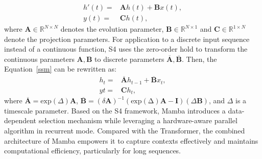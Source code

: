 \documentclass{article}
\begin{document}
\begin{equation}
\begin{aligned}
    h'(t) =& \mathbf{A}h(t) + \mathbf{B}x(t),\\
    y(t) =& \mathbf{C}h(t),
\label{ssm}
\end{aligned}
\end{equation}
where $\mathbf{A}\in\mathbb{R}^{N\times N}$ denotes the evolution parameter, $\mathbf{B}\in\mathbb{R}^{N\times 1}$ and $\mathbf{C}\in\mathbb{R}^{1\times N}$ denote the projection parameters. For application to a discrete input sequence instead of a continuous function, S4 uses the zero-order hold to transform the continuous parameters $\mathbf{A},\mathbf{B}$ to discrete parameters $\overline{\mathbf{A}},\overline{\mathbf{B}}$. Then, the Equation~\eqref{ssm} can be rewritten as:
\begin{equation}
\begin{aligned}
    h_t =& \overline{\mathbf{A}}h_{t-1} + \overline{\mathbf{B}}x_t,\\
    yt =& \mathbf{C}h_t,
\end{aligned}
\end{equation}
where $\overline{\mathbf{A}}=\mathrm{exp}(\Delta)\mathbf{A}$, $\overline{\mathbf{B}}=(\delta\mathbf{A})^{-1}(\mathrm{exp(\Delta)\mathbf{A}}-\mathbf{I})(\Delta\mathbf{B})$, and $\Delta$ is a timescale parameter. Based on the S4 framework, Mamba introduces a data-dependent selection mechanism while leveraging a hardware-aware parallel algorithm in recurrent mode. Compared with the Transformer, the combined architecture of Mamba empowers it to capture contexts effectively and maintains computational efficiency, particularly for long sequences.
\end{document}
